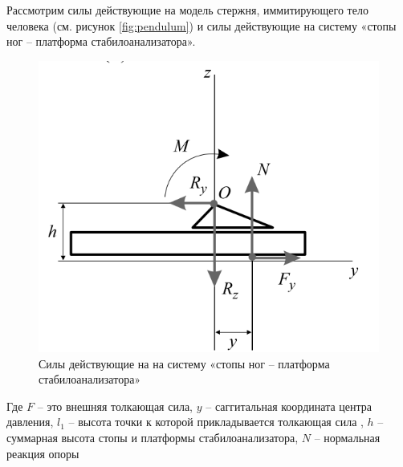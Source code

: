 \documentclass[a4paper,12pt, openany]{book}
\theoremstyle{plain} %
\theoremstyle{definition} %
\theoremstyle{remark} %
\numberwithin{equation}{chapter}
\begin{document}
{Рассмотрим силы действующие на модель стержня, иммитирующего тело человека (см. рисунок \ref{fig:pendulum})
и силы действующие на систему «стопы ног – платформа стабилоанализатора».
\begin{figure}[h!]
    \centering
    \includegraphics[width=0.5\linewidth]{foot.png}
    \caption{Силы действующие на на систему «стопы ног – платформа стабилоанализатора» }
    \label{fig:foot-platform}
\end{figure}

Где $F$ – это внешняя толкающая сила, $y$ – саггитальная координата центра давления, $l_1$ – высота точки к которой прикладывается толкающая сила
, $h$ – суммарная высота стопы и платформы стабилоанализатора, $N$ – нормальная реакция опоры

}
\end{document}

